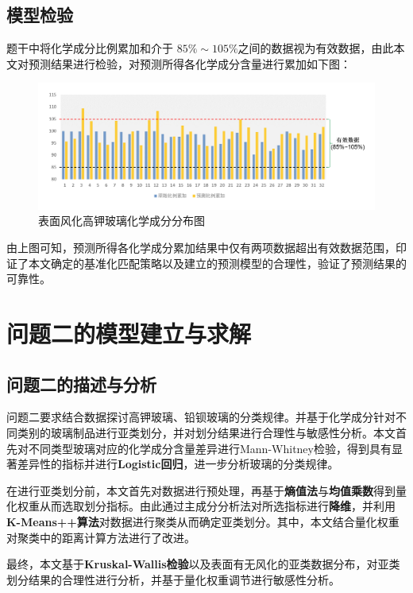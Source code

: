 \documentclass[withoutpreface,bwprint]{cumcmthesis} %
\begin{document}
\subsection{模型检验}

题干中将化学成分比例累加和介于 $85\% \sim 105\%$之间的数据视为有效数据，由此本文对预测结果进行检验，对预测所得各化学成分含量进行累加如下图：
\begin{figure}[H]
  \centering
  \includegraphics[width=1.1\textwidth]{figure/有效}
  \caption{表面风化高钾玻璃化学成分分布图}
  \label{youxiao}
\end{figure}

由上图可知，预测所得各化学成分累加结果中仅有两项数据超出有效数据范围，印证了本文确定的基准化匹配策略以及建立的预测模型的合理性，验证了预测结果的可靠性。

\section{问题二的模型建立与求解}

\subsection{问题二的描述与分析}

问题二要求结合数据探讨高钾玻璃、铅钡玻璃的分类规律。并基于化学成分针对不同类别的玻璃制品进行亚类划分，并对划分结果进行合理性与敏感性分析。本文首先对不同类型玻璃对应的化学成分含量差异进行Mann-Whitney检验，得到具有显著差异性的指标并进行\textbf{Logistic回归}，进一步分析玻璃的分类规律。

在进行亚类划分前，本文首先对数据进行预处理，再基于\textbf{熵值法}与\textbf{均值乘数}得到量化权重从而选取划分指标。由此通过主成分分析法对所选指标进行\textbf{降维}，并利用\textbf{K-Means++算法}对数据进行聚类从而确定亚类划分。其中，本文结合量化权重对聚类中的距离计算方法进行了改进。

最终，本文基于\textbf{Kruskal-Wallis检验}以及表面有无风化的亚类数据分布，对亚类划分结果的合理性进行分析，并基于量化权重调节进行敏感性分析。
\end{document}
